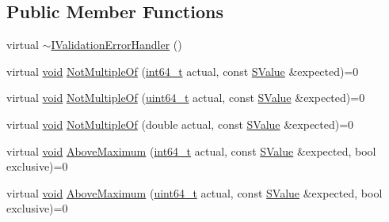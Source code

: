 \subsection*{Public Member Functions}
\begin{DoxyCompactItemize}
\item 
virtual \hyperlink{classinternal_1_1IValidationErrorHandler_a79e5eb5707b73497cff913093dfec060}{$\sim$\+I\+Validation\+Error\+Handler} ()
\item 
virtual \hyperlink{imgui__impl__opengl3__loader_8h_ac668e7cffd9e2e9cfee428b9b2f34fa7}{void} \hyperlink{classinternal_1_1IValidationErrorHandler_a195a561f0bbbfb66961c9331a6afab39}{Not\+Multiple\+Of} (\hyperlink{stdint_8h_a414156feea104f8f75b4ed9e3121b2f6}{int64\+\_\+t} actual, const \hyperlink{classinternal_1_1IValidationErrorHandler_a22eda6c4ea9537f1ba00d76af052649a}{S\+Value} \&expected)=0
\item 
virtual \hyperlink{imgui__impl__opengl3__loader_8h_ac668e7cffd9e2e9cfee428b9b2f34fa7}{void} \hyperlink{classinternal_1_1IValidationErrorHandler_ad8bd123f154f4c39f48b366219878526}{Not\+Multiple\+Of} (\hyperlink{stdint_8h_aec6fcb673ff035718c238c8c9d544c47}{uint64\+\_\+t} actual, const \hyperlink{classinternal_1_1IValidationErrorHandler_a22eda6c4ea9537f1ba00d76af052649a}{S\+Value} \&expected)=0
\item 
virtual \hyperlink{imgui__impl__opengl3__loader_8h_ac668e7cffd9e2e9cfee428b9b2f34fa7}{void} \hyperlink{classinternal_1_1IValidationErrorHandler_ada3d2275ccdeb4874f34942d257af9c5}{Not\+Multiple\+Of} (double actual, const \hyperlink{classinternal_1_1IValidationErrorHandler_a22eda6c4ea9537f1ba00d76af052649a}{S\+Value} \&expected)=0
\item 
virtual \hyperlink{imgui__impl__opengl3__loader_8h_ac668e7cffd9e2e9cfee428b9b2f34fa7}{void} \hyperlink{classinternal_1_1IValidationErrorHandler_a7dc32dfac536f8577cbcb702efde26d2}{Above\+Maximum} (\hyperlink{stdint_8h_a414156feea104f8f75b4ed9e3121b2f6}{int64\+\_\+t} actual, const \hyperlink{classinternal_1_1IValidationErrorHandler_a22eda6c4ea9537f1ba00d76af052649a}{S\+Value} \&expected, bool exclusive)=0
\item 
virtual \hyperlink{imgui__impl__opengl3__loader_8h_ac668e7cffd9e2e9cfee428b9b2f34fa7}{void} \hyperlink{classinternal_1_1IValidationErrorHandler_a78554707b14366d2ff7763290e1a6219}{Above\+Maximum} (\hyperlink{stdint_8h_aec6fcb673ff035718c238c8c9d544c47}{uint64\+\_\+t} actual, const \hyperlink{classinternal_1_1IValidationErrorHandler_a22eda6c4ea9537f1ba00d76af052649a}{S\+Value} \&expected, bool exclusive)=0

\end{DoxyCompactItemize}
